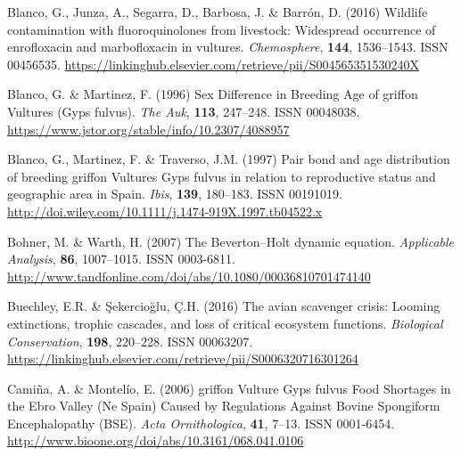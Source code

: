 \documentclass[12pt]{article}
\begin{document}
\begin{thebibliography}{87}
	Blanco, G., Junza, A., Segarra, D., Barbosa, J. \& Barr{\'{o}}n, D. (2016)
	{Wildlife contamination with fluoroquinolones from livestock: Widespread
		occurrence of enrofloxacin and marbofloxacin in vultures}.
	\newblock \emph{Chemosphere}, \textbf{144}, 1536--1543.
	\newblock ISSN 00456535.
	\newline\urlprefix\url{https://linkinghub.elsevier.com/retrieve/pii/S004565351530240X}
	
	Blanco, G. \& Martinez, F. (1996) {Sex Difference in Breeding Age of griffon
		Vultures (Gyps fulvus)}.
	\newblock \emph{The Auk}, \textbf{113}, 247--248.
	\newblock ISSN 00048038.
	\newline\urlprefix\url{https://www.jstor.org/stable/info/10.2307/4088957}
	
	Blanco, G., Martinez, F. \& Traverso, J.M. (1997) {Pair bond and age
		distribution of breeding griffon Vultures Gyps fulvus in relation to
		reproductive status and geographic area in Spain}.
	\newblock \emph{Ibis}, \textbf{139}, 180--183.
	\newblock ISSN 00191019.
	\newline\urlprefix\url{http://doi.wiley.com/10.1111/j.1474-919X.1997.tb04522.x}
	
	Bohner, M. \& Warth, H. (2007) {The Beverton–Holt dynamic equation}.
	\newblock \emph{Applicable Analysis}, \textbf{86}, 1007--1015.
	\newblock ISSN 0003-6811.
	\newline\urlprefix\url{http://www.tandfonline.com/doi/abs/10.1080/00036810701474140}
	
	Buechley, E.R. \& Şekercioğlu, {\c{C}}.H. (2016) {The avian scavenger crisis:
		Looming extinctions, trophic cascades, and loss of critical ecosystem
		functions}.
	\newblock \emph{Biological Conservation}, \textbf{198}, 220--228.
	\newblock ISSN 00063207.
	\newline\urlprefix\url{https://linkinghub.elsevier.com/retrieve/pii/S0006320716301264}
	
	Cami{\~{n}}a, A. \& Montel{\'{i}}o, E. (2006) {griffon Vulture Gyps fulvus Food
		Shortages in the Ebro Valley (Ne Spain) Caused by Regulations Against Bovine
		Spongiform Encephalopathy (BSE)}.
	\newblock \emph{Acta Ornithologica}, \textbf{41}, 7--13.
	\newblock ISSN 0001-6454.
	\newline\urlprefix\url{http://www.bioone.org/doi/abs/10.3161/068.041.0106}
	

\end{thebibliography}
\end{document}
